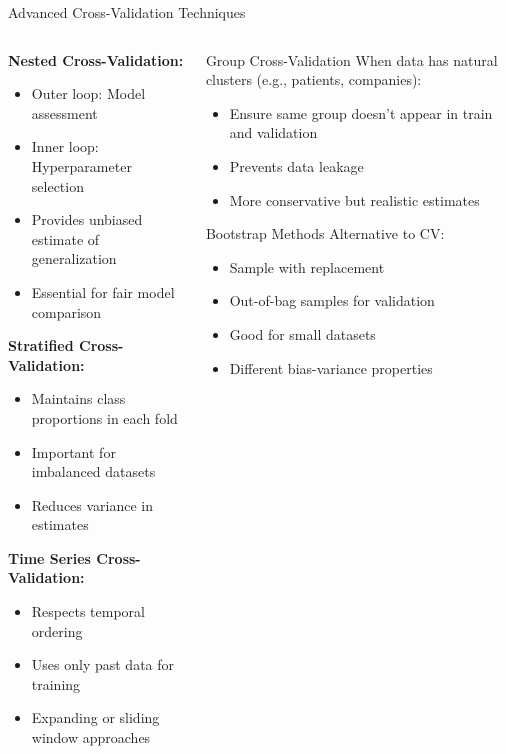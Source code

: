 \documentclass[aspectratio=169,11pt]{beamer}
\begin{document}
\begin{frame}{Advanced Cross-Validation Techniques}
\begin{columns}
\begin{column}{0.5\textwidth}
\textbf{Nested Cross-Validation:}
\begin{itemize}
\item Outer loop: Model assessment
\item Inner loop: Hyperparameter selection
\item Provides unbiased estimate of generalization
\item Essential for fair model comparison
\end{itemize}

\vspace{0.3cm}
\textbf{Stratified Cross-Validation:}
\begin{itemize}
\item Maintains class proportions in each fold
\item Important for imbalanced datasets
\item Reduces variance in estimates
\end{itemize}

\vspace{0.3cm}
\textbf{Time Series Cross-Validation:}
\begin{itemize}
\item Respects temporal ordering
\item Uses only past data for training
\item Expanding or sliding window approaches
\end{itemize}
\end{column}
\begin{column}{0.5\textwidth}
\begin{block}{Group Cross-Validation}
When data has natural clusters (e.g., patients, companies):
\begin{itemize}
\item Ensure same group doesn't appear in train and validation
\item Prevents data leakage
\item More conservative but realistic estimates
\end{itemize}
\end{block}

\begin{block}{Bootstrap Methods}
Alternative to CV:
\begin{itemize}
\item Sample with replacement
\item Out-of-bag samples for validation
\item Good for small datasets
\item Different bias-variance properties
\end{itemize}
\end{block}


\end{column}
\end{columns}
\end{frame}
\end{document}
